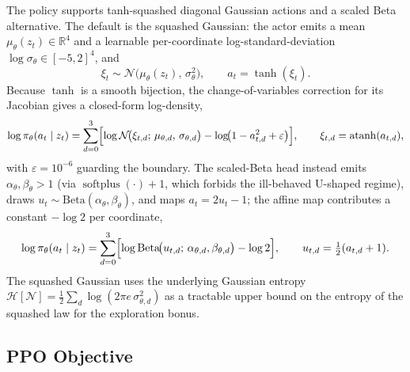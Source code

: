 \documentclass[10pt]{article}
\newcommand{\R}{\mathbb{R}}
\begin{document}
The policy supports tanh-squashed diagonal Gaussian actions and a scaled Beta alternative.
The default is the squashed Gaussian: the actor emits a mean \(\mu_\theta(z_t)\in\R^4\) and a
learnable per-coordinate log-standard-deviation \(\log\sigma_\theta\in[-5,2]^4\), and
\[
	\xi_t\sim\mathcal{N}\!\bigl(\mu_\theta(z_t),\,\sigma_\theta^2\bigr),\qquad
	a_t=\tanh(\xi_t).
\]
Because \(\tanh\) is a smooth bijection, the change-of-variables correction for its Jacobian
gives a closed-form log-density,
\[
	\log\pi_\theta(a_t\mid z_t)
	=
	\sum_{d=0}^{3}\Bigl[
		\log\mathcal{N}\!\bigl(\xi_{t,d};\,\mu_{\theta,d},\,\sigma_{\theta,d}\bigr)
		-\log\!\bigl(1-a_{t,d}^2+\varepsilon\bigr)
	\Bigr],
	\qquad \xi_{t,d}=\operatorname{atanh}(a_{t,d}),
\]
with \(\varepsilon=10^{-6}\) guarding the boundary. The scaled-Beta head instead emits
\(\alpha_\theta,\beta_\theta>1\) (via \(\operatorname{softplus}(\cdot)+1\), which forbids the
ill-behaved U-shaped regime), draws \(u_t\sim\mathrm{Beta}(\alpha_\theta,\beta_\theta)\), and
maps \(a_t=2u_t-1\); the affine map contributes a constant \(-\log 2\) per coordinate,
\[
	\log\pi_\theta(a_t\mid z_t)
	=
	\sum_{d=0}^{3}\Bigl[\log\mathrm{Beta}\!\bigl(u_{t,d};\,\alpha_{\theta,d},\beta_{\theta,d}\bigr)-\log 2\Bigr],
	\qquad u_{t,d}=\tfrac12(a_{t,d}+1).
\]
The squashed Gaussian uses the underlying Gaussian entropy
\(\mathcal{H}[\mathcal{N}]=\tfrac12\sum_d\log(2\pi e\,\sigma_{\theta,d}^2)\) as a tractable upper
bound on the entropy of the squashed law for the exploration bonus.

\subsection{PPO Objective}
\end{document}
